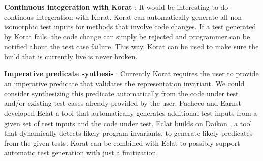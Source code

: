 \para
\textbf{Continuous integeration with Korat} : It would be interesting to do continous integeration \cite{fowler2006continuous} with Korat. Korat can automatically generate all non-isomorphic test inputs for methods that involve code changes. If a test generated by Korat fails, the code change can simply be rejected and programmer can be notified about the test case failure. This way, Korat can be used to make sure the build that is currently live is never broken.

\para
\textbf{Imperative predicate synthesis} : Currently Korat requires the user to provide an imperative predicate that validates the representation invariant. We could consider synthesizing this predicate automatically from the code under test and/or existing test cases already provided by the user. Pacheco and Earnst developed Eclat \cite{pacheco2005eclat} a tool that automatically generates additional test inputs from a given set of test inputs and the code under test. Eclat builds on Daikon \cite{ernst2007daikon}, a tool that dynamically detects likely program invariants, to generate likely predicates from the given tests. Korat can be combined with Eclat to possibly support automatic test generation with just a finitization.





